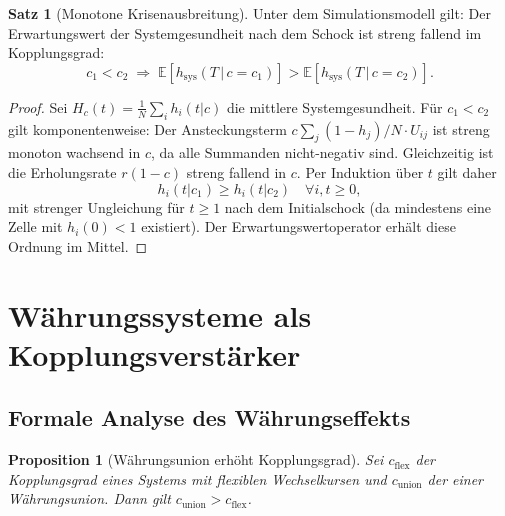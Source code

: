 \documentclass[a4paper, 12pt, twoside, openright]{report}
\newtheorem{proposition}[theorem]{Proposition}
\theoremstyle{definition}
\theoremstyle{definition}
\newtheorem{satz}{Satz}[chapter]
\begin{document}
\begin{satz}[Monotone Krisenausbreitung]
\label{satz:monoton}
    Unter dem Simulationsmodell gilt: Der Erwartungswert der Systemgesundheit nach dem
    Schock ist streng fallend im Kopplungsgrad:
    \[
        c_1 < c_2 \;\Rightarrow\; \mathbb{E}[h_{\text{sys}}(T\,|\,c=c_1)]
        > \mathbb{E}[h_{\text{sys}}(T\,|\,c=c_2)].
    \]
\end{satz}

\begin{proof}
    Sei $H_c(t) = \frac{1}{N}\sum_i h_i(t|c)$ die mittlere Systemgesundheit. Für
    $c_1 < c_2$ gilt komponentenweise: Der Ansteckungsterm
    $c\sum_j (1-h_j)/N \cdot U_{ij}$ ist streng monoton wachsend in $c$, da alle
    Summanden nicht-negativ sind. Gleichzeitig ist die Erholungsrate $r(1-c)$ streng
    fallend in $c$. Per Induktion über $t$ gilt daher
    \[
        h_i(t|c_1) \geq h_i(t|c_2) \quad \forall i, t \geq 0,
    \]
    mit strenger Ungleichung für $t \geq 1$ nach dem Initialschock (da mindestens eine
    Zelle mit $h_i(0) < 1$ existiert). Der Erwartungswertoperator erhält diese Ordnung
    im Mittel.
\end{proof}

\section{Währungssysteme als Kopplungsverstärker}

\subsection{Formale Analyse des Währungseffekts}

\begin{proposition}[Währungsunion erhöht Kopplungsgrad]
\label{prop:waehrung}
    Sei $c_{\text{flex}}$ der Kopplungsgrad eines Systems mit flexiblen Wechselkursen
    und $c_{\text{union}}$ der einer Währungsunion. Dann gilt
    $c_{\text{union}} > c_{\text{flex}}$.
\end{proposition}
\end{document}
